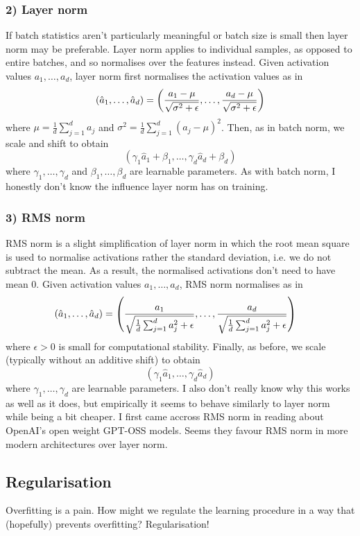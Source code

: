 \documentclass[11pt]{article}
\begin{document}
\subsubsection*{2) Layer norm}
If batch statistics aren't particularly meaningful or batch size is small then layer norm may be preferable. Layer norm applies to individual samples, as opposed to entire batches, and so normalises over the features instead. Given activation values $a_1,\dots,a_d$, layer norm first normalises the activation values as in
$$
(\hat{a}_1,\dots,\hat{a}_d)
=
\left(\frac{a_1-\mu}{\sqrt{\sigma^2+\epsilon}},\dots,\frac{a_d-\mu}{\sqrt{\sigma^2+\epsilon}}\right)
$$
where $\mu=\frac{1}{d}\sum_{j=1}^da_j$ and $\sigma^2=\frac{1}{d}\sum_{j=1}^d(a_j-\mu)^2$. Then, as in batch norm, we scale and shift to obtain
$$
(\gamma_1\hat{a}_1+\beta_1,\dots,\gamma_d\hat{a}_d+\beta_d)
$$
where $\gamma_1,\dots,\gamma_d$ and $\beta_1,\dots,\beta_d$ are learnable parameters. As with batch norm, I honestly don't know the influence layer norm has on training.

\subsubsection*{3) RMS norm}
RMS norm is a slight simplification of layer norm in which the root mean square is used to normalise activations rather the standard deviation, i.e. we do not subtract the mean. As a result, the normalised activations don't need to have mean $0$. Given activation values $a_1,\dots,a_d$, RMS norm normalises as in
\begin{align*}
    (\hat{a}_1,\dots,\hat{a}_d)
    &=
    \left(\frac{a_1}{\sqrt{\frac{1}{d}\sum_{j=1}^da_j^2+\epsilon}},\dots,\frac{a_d}{\sqrt{\frac{1}{d}\sum_{j=1}^da_j^2+\epsilon}}\right)
\end{align*}
where $\epsilon>0$ is small for computational stability. Finally, as before, we scale (typically without an additive shift) to obtain
$$
(\gamma_1\hat{a}_1,\dots,\gamma_d\hat{a}_d)
$$
where $\gamma_1,\dots,\gamma_d$ are learnable parameters. I also don't really know why this works as well as it does, but empirically it seems to behave similarly to layer norm while being a bit cheaper. I first came accross RMS norm in reading about OpenAI's open weight GPT-OSS models. Seems they favour RMS norm in more modern architectures over layer norm.

\subsection{Regularisation}
Overfitting is a pain. How might we regulate the learning procedure in a way that (hopefully) prevents overfitting? Regularisation!
\end{document}
